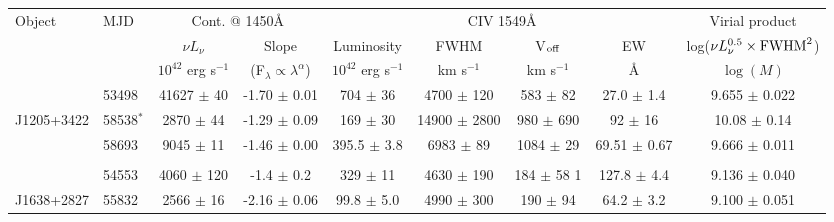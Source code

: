\begin{table*}
  \scriptsize
  \begin{centering}
    \begin{tabular}{l | l | c c | c c c c | c}
      \hline
      \hline
        Object         &  MJD         &  \multicolumn{2}{c}{Cont. @ 1450\AA }                              &   \multicolumn{4}{c}{CIV 1549\AA}                                                                   &  Virial product \\
                       &              &       $\nu L_{\nu}$      &         Slope                           &   Luminosity             &     FWHM             &    V$_{\rm off}$           &          EW          &  log($\nu L_{\nu}^{0.5} \times {\rm FWHM}^2$)\\
                       &              & $10^{42}$ erg s$^{-1}$   & (F$_\lambda \propto \lambda^\alpha$)    & $10^{42}$ erg s$^{-1}$   &     km s$^{-1}$      &    km s$^{-1}$             &          \AA         &  $\log(M)$ \\
      \hline
                       &  53498       &   41627    $\pm$   40    &  -1.70 $\pm$ 0.01                       &  704      $\pm$ 36       &  4700 $\pm$  120     &     583    $\pm$   82      &   27.0  $\pm$  1.4   &  9.655 $\pm$ 0.022\\
          J1205+3422   &  58538$^*$   &    2870    $\pm$   44    &  -1.29 $\pm$ 0.09                       &  169      $\pm$ 30       & 14900 $\pm$ 2800     &     980    $\pm$  690      &   92    $\pm$ 16     & 10.08  $\pm$ 0.14 \\
                       &  58693       &    9045    $\pm$   11    &  -1.46 $\pm$ 0.00                       &  395.5    $\pm$  3.8     &  6983 $\pm$   89     &    1084    $\pm$   29      &   69.51 $\pm$  0.67  &  9.666 $\pm$ 0.011\\
                       &              &                          &                                         &                          &                      &                            &                      &                  \\
                       &  54553       &    4060    $\pm$  120    &  -1.4  $\pm$ 0.2                        &  329      $\pm$ 11       &  4630 $\pm$  190     &     184    $\pm$   58  1   &  127.8  $\pm$  4.4   &  9.136 $\pm$ 0.040\\
          J1638+2827   &  55832       &    2566    $\pm$   16    &  -2.16 $\pm$ 0.06                       &   99.8    $\pm$  5.0     &  4990 $\pm$  300     &     190    $\pm$   94      &   64.2  $\pm$  3.2   &  9.100 $\pm$ 0.051\\

\end{tabular}
\end{centering}
\end{table*}
